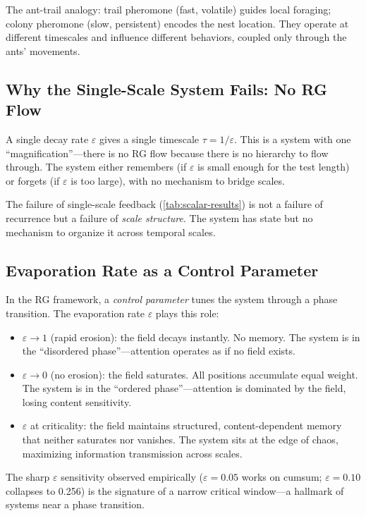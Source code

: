 \documentclass[11pt,a4paper]{article}
\newcommand{\evap}{\varepsilon}
\begin{document}
The ant-trail analogy: trail pheromone (fast, volatile) guides local
foraging; colony pheromone (slow, persistent) encodes the nest
location.  They operate at different timescales and influence
different behaviors, coupled only through the ants' movements.

\subsection{Why the Single-Scale System Fails: No RG Flow}

A single decay rate $\evap$ gives a single timescale $\tau = 1/\evap$.
This is a system with one ``magnification''---there is no RG flow
because there is no hierarchy to flow through.  The system either
remembers (if $\evap$ is small enough for the test length) or
forgets (if $\evap$ is too large), with no mechanism to bridge
scales.

The failure of single-scale feedback (\cref{tab:scalar-results}) is
not a failure of recurrence but a failure of \emph{scale structure}.
The system has state but no mechanism to organize it across temporal
scales.

\subsection{Evaporation Rate as a Control Parameter}

In the RG framework, a \emph{control parameter} tunes the system
through a phase transition.  The evaporation rate $\evap$ plays this
role:

\begin{itemize}
  \item $\evap \to 1$ (rapid erosion): the field decays instantly.
    No memory.  The system is in the ``disordered phase''---attention
    operates as if no field exists.
  \item $\evap \to 0$ (no erosion): the field saturates.  All
    positions accumulate equal weight.  The system is in the
    ``ordered phase''---attention is dominated by the field, losing
    content sensitivity.
  \item $\evap$ at criticality: the field maintains structured,
    content-dependent memory that neither saturates nor vanishes.
    The system sits at the edge of chaos, maximizing information
    transmission across scales.
\end{itemize}

The sharp $\evap$ sensitivity observed empirically ($\evap = 0.05$
works on cumsum; $\evap = 0.10$ collapses to 0.256) is the signature
of a narrow critical window---a hallmark of systems near a phase
transition.
\end{document}

